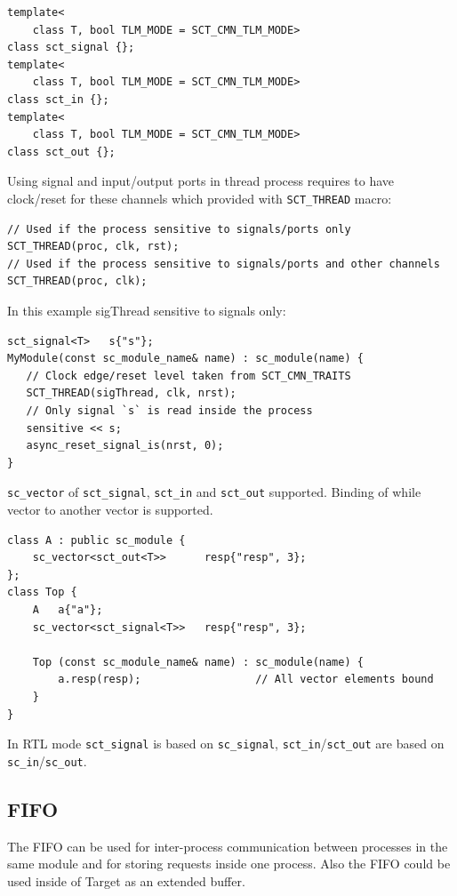 \begin{lstlisting}[style=mycpp]
template<
    class T, bool TLM_MODE = SCT_CMN_TLM_MODE>
class sct_signal {};
template<
    class T, bool TLM_MODE = SCT_CMN_TLM_MODE>
class sct_in {};
template<
    class T, bool TLM_MODE = SCT_CMN_TLM_MODE>
class sct_out {};
\end{lstlisting}

Using signal and input/output ports in thread process requires to have clock/reset for these channels which provided with {\tt SCT\_THREAD} macro:
\begin{lstlisting}[style=mycpp]
// Used if the process sensitive to signals/ports only  
SCT_THREAD(proc, clk, rst);  
// Used if the process sensitive to signals/ports and other channels
SCT_THREAD(proc, clk);       
\end{lstlisting}

In this example sigThread sensitive to signals only:
\begin{lstlisting}[style=mycpp]
sct_signal<T>   s{"s"};
MyModule(const sc_module_name& name) : sc_module(name) {  
   // Clock edge/reset level taken from SCT_CMN_TRAITS
   SCT_THREAD(sigThread, clk, nrst); 
   // Only signal `s` is read inside the process
   sensitive << s;                   
   async_reset_signal_is(nrst, 0);
}
\end{lstlisting}

{\tt sc\_vector} of {\tt sct\_signal}, {\tt sct\_in} and {\tt sct\_out} supported. Binding of while vector to another vector is supported.
\begin{lstlisting}[style=mycpp]
class A : public sc_module {
    sc_vector<sct_out<T>>      resp{"resp", 3};
};
class Top {
    A   a{"a"};
    sc_vector<sct_signal<T>>   resp{"resp", 3};

    Top (const sc_module_name& name) : sc_module(name) {        
        a.resp(resp);                  // All vector elements bound
    }
}
\end{lstlisting}

In RTL mode {\tt sct\_signal} is based on {\tt sc\_signal}, {\tt sct\_in}/{\tt sct\_out} are based on {\tt sc\_in}/{\tt sc\_out}.


\subsection{FIFO}\label{section:sct_fifo}

The FIFO can be used for inter-process communication between processes in the same module and for storing requests inside one process. Also the FIFO could be used inside of Target as an extended buffer.

